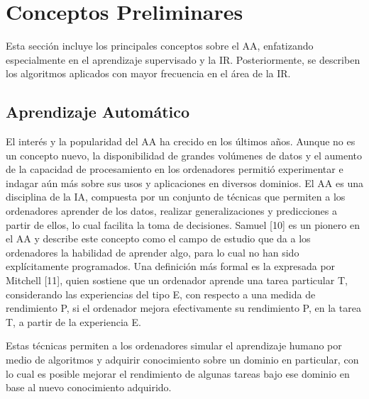 \documentclass[journal]{IEEEtran}
\begin{document}
\section{Conceptos Preliminares}

Esta sección incluye los principales conceptos sobre el AA, enfatizando especialmente en el aprendizaje supervisado y la IR. Posteriormente, se describen los algoritmos aplicados con mayor frecuencia en el área de la IR.

\subsection{Aprendizaje Automático}

El interés y la popularidad del AA ha crecido en los últimos años. Aunque no es un concepto nuevo, la disponibilidad de grandes volúmenes de datos y el aumento de la capacidad de procesamiento en los ordenadores permitió experimentar e indagar aún más sobre sus usos y aplicaciones en diversos dominios.
El AA es una disciplina de la IA, compuesta por un conjunto de técnicas que permiten a los ordenadores aprender de los datos, realizar generalizaciones y predicciones a partir de ellos, lo cual facilita la toma de decisiones. Samuel \cite{samuel1959some}[10] es un pionero en el AA y describe este concepto como el campo de estudio que da a los ordenadores la habilidad de aprender algo, para lo cual no han sido explícitamente programados. Una definición más formal es la expresada por Mitchell \cite{mitchell1997machine}[11], quien sostiene que un ordenador aprende una tarea particular T, considerando las experiencias del tipo E, con respecto a una medida de rendimiento P, si el ordenador mejora efectivamente su rendimiento P, en la tarea T, a partir de la experiencia E.

Estas técnicas permiten a los ordenadores simular el aprendizaje humano por medio de algoritmos y adquirir conocimiento sobre un dominio en particular, con lo cual es posible mejorar el rendimiento de algunas tareas bajo ese dominio en base al nuevo conocimiento adquirido.
\end{document}
